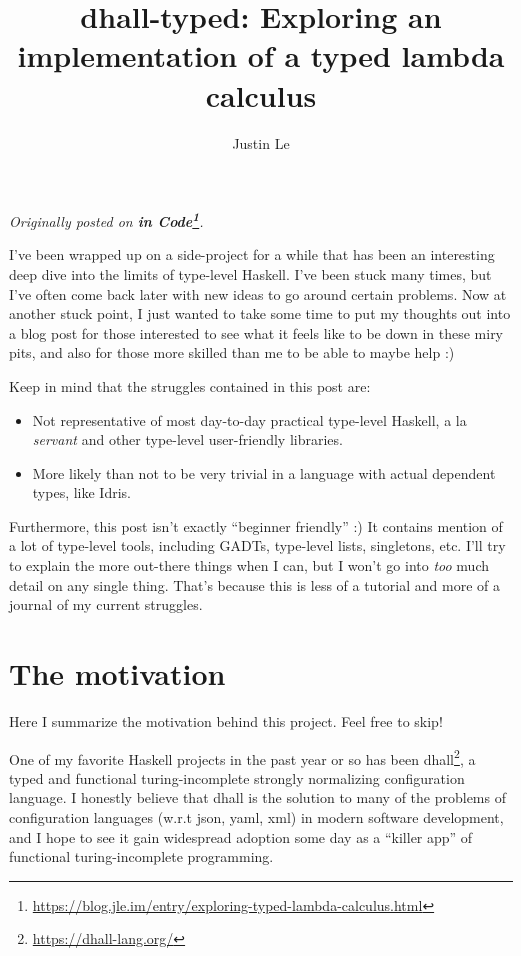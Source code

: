 \documentclass[]{article}
\title{dhall-typed: Exploring an implementation of a typed lambda calculus}
\author{Justin Le}
\renewcommand{\href}[2]{#2\footnote{\url{#1}}}
\begin{document}
\maketitle

\emph{Originally posted on
\textbf{\href{https://blog.jle.im/entry/exploring-typed-lambda-calculus.html}{in
Code}}.}

I've been wrapped up on a side-project for a while that has been an interesting
deep dive into the limits of type-level Haskell. I've been stuck many times, but
I've often come back later with new ideas to go around certain problems. Now at
another stuck point, I just wanted to take some time to put my thoughts out into
a blog post for those interested to see what it feels like to be down in these
miry pits, and also for those more skilled than me to be able to maybe help :)

Keep in mind that the struggles contained in this post are:

\begin{itemize}
\tightlist
\item
  Not representative of most day-to-day practical type-level Haskell, a la
  \emph{servant} and other type-level user-friendly libraries.
\item
  More likely than not to be very trivial in a language with actual dependent
  types, like Idris.
\end{itemize}

Furthermore, this post isn't exactly ``beginner friendly'' :) It contains
mention of a lot of type-level tools, including GADTs, type-level lists,
singletons, etc. I'll try to explain the more out-there things when I can, but I
won't go into \emph{too} much detail on any single thing. That's because this is
less of a tutorial and more of a journal of my current struggles.

\hypertarget{the-motivation}{%
\section{The motivation}\label{the-motivation}}

Here I summarize the motivation behind this project. Feel free to skip!

One of my favorite Haskell projects in the past year or so has been
\href{https://dhall-lang.org/}{dhall}, a typed and functional turing-incomplete
strongly normalizing configuration language. I honestly believe that dhall is
the solution to many of the problems of configuration languages (w.r.t json,
yaml, xml) in modern software development, and I hope to see it gain widespread
adoption some day as a ``killer app'' of functional turing-incomplete
programming.
\end{document}
